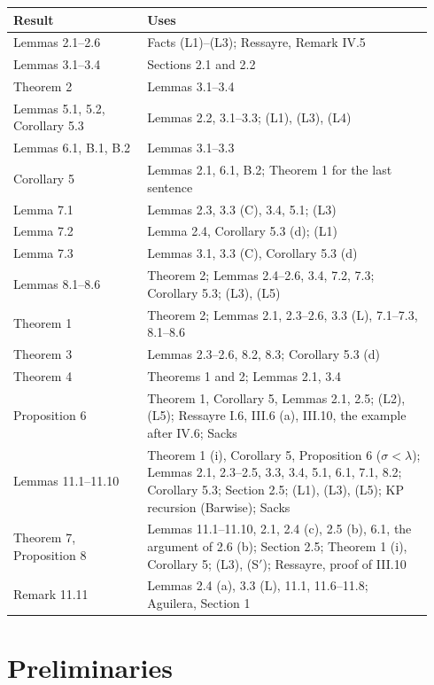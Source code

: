 \documentclass[11pt]{article}
\begin{document}
\begin{center}\begin{tabular}{p{0.30\linewidth}p{0.64\linewidth}}
\toprule
Result & Uses \\
\midrule
Lemmas 2.1--2.6 & Facts (L1)--(L3); Ressayre, Remark IV.5 \\
Lemmas 3.1--3.4 & Sections 2.1 and 2.2 \\
Theorem 2 & Lemmas 3.1--3.4 \\
Lemmas 5.1, 5.2, Corollary 5.3 & Lemmas 2.2, 3.1--3.3; (L1), (L3), (L4) \\
Lemmas 6.1, B.1, B.2 & Lemmas 3.1--3.3 \\
Corollary 5 & Lemmas 2.1, 6.1, B.2; Theorem 1 for the last sentence \\
Lemma 7.1 & Lemmas 2.3, 3.3 (C), 3.4, 5.1; (L3) \\
Lemma 7.2 & Lemma 2.4, Corollary 5.3 (d); (L1) \\
Lemma 7.3 & Lemmas 3.1, 3.3 (C), Corollary 5.3 (d) \\
Lemmas 8.1--8.6 & Theorem 2; Lemmas 2.4--2.6, 3.4, 7.2, 7.3; Corollary 5.3; (L3), (L5) \\
Theorem 1 & Theorem 2; Lemmas 2.1, 2.3--2.6, 3.3 (L), 7.1--7.3, 8.1--8.6 \\
Theorem 3 & Lemmas 2.3--2.6, 8.2, 8.3; Corollary 5.3 (d) \\
Theorem 4 & Theorems 1 and 2; Lemmas 2.1, 3.4 \\
Proposition 6 & Theorem 1, Corollary 5, Lemmas 2.1, 2.5; (L2), (L5); Ressayre I.6, III.6 (a), III.10, the example
after IV.6; Sacks \\
Lemmas 11.1--11.10 & Theorem 1 (i), Corollary 5, Proposition 6 ($\sigma < \lambda$); Lemmas 2.1, 2.3--2.5, 3.3, 3.4,
5.1, 6.1, 7.1, 8.2; Corollary 5.3; Section 2.5; (L1), (L3), (L5); KP recursion (Barwise); Sacks \\
Theorem 7, Proposition 8 & Lemmas 11.1--11.10, 2.1, 2.4 (c), 2.5 (b), 6.1, the argument of 2.6 (b); Section 2.5;
Theorem 1 (i), Corollary 5; (L3), (S$'$); Ressayre, proof of III.10 \\
Remark 11.11 & Lemmas 2.4 (a), 3.3 (L), 11.1, 11.6--11.8; Aguilera, Section 1 \\
\bottomrule
\end{tabular}\end{center}

\section{Preliminaries}
\end{document}
